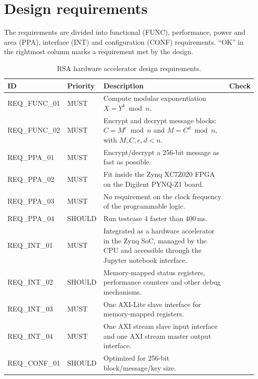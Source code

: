 \section{Design requirements}

The requirements are divided into functional (FUNC), performance, power and
area (PPA), interface (INT) and configuration (CONF) requirements. ``OK'' in
the rightmost column marks a requirement met by the design.

\begin{table}[H]
\centering
\small
\begin{tabularx}{\textwidth}{l l X c}
\toprule
\textbf{ID} & \textbf{Priority} & \textbf{Description} & \textbf{Check} \\
\midrule
REQ\_FUNC\_01 & MUST & Compute modular exponentiation $X = Y^k \bmod n$. & \\
REQ\_FUNC\_02 & MUST & Encrypt and decrypt message blocks: $C = M^e \bmod n$ and $M = C^d \bmod n$, with $M, C, e, d < n$. & \\
REQ\_PPA\_01 & MUST & Encrypt/decrypt a 256-bit message as fast as possible. & \\
REQ\_PPA\_02 & MUST & Fit inside the Zynq XC7Z020 FPGA on the Digilent PYNQ-Z1 board. & \\
REQ\_PPA\_03 & MUST & No requirement on the clock frequency of the programmable logic. & \\
REQ\_PPA\_04 & SHOULD & Run testcase 4 faster than 400\,ms. & \\
REQ\_INT\_01 & MUST & Integrated as a hardware accelerator in the Zynq SoC, managed by the CPU and accessible through the Jupyter notebook interface. & \\
REQ\_INT\_02 & SHOULD & Memory-mapped status registers, performance counters and other debug mechanisms. & \\
REQ\_INT\_03 & MUST & One AXI-Lite slave interface for memory-mapped registers. & \\
REQ\_INT\_04 & MUST & One AXI stream slave input interface and one AXI stream master output interface. & \\
REQ\_CONF\_01 & SHOULD & Optimized for 256-bit block/message/key size. & \\
\bottomrule
\end{tabularx}
\caption{RSA hardware accelerator design requirements.}
\label{tab:design_req}
\end{table}

